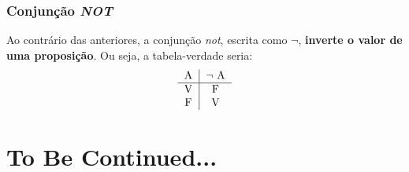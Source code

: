 \documentclass{article}
\begin{document}
\subsubsection{Conjunção \emph{NOT}}
Ao contrário das anteriores, a conjunção \emph{not}, escrita como $\lnot$, \textbf{inverte o valor de uma proposição}. Ou seja, a tabela-verdade seria:
\begin{align*}
    \begin{tabular}{c|c}
        A & $\lnot$ A  \\
        \hline
        V & F \\
        F & V \\
    \end{tabular}
\end{align*}

\section{To Be Continued...}
\end{document}
